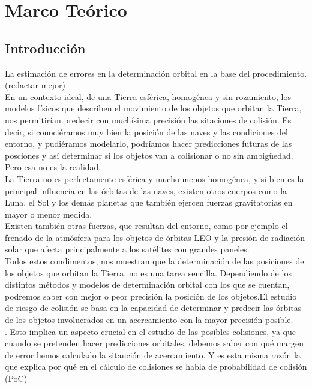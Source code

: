 \chapter{Marco Teórico}
\label{chap:marcoteorico}

\section{Introducci\'on}

La estimaci\'on de errores en la determinaci\'on orbital en la base del procedimiento.(redactar mejor)\\
En un contexto ideal, de una Tierra esf\'erica, homog\'enea y sin rozamiento, los modelos f\'isicos que describen el movimiento de los objetos que orbitan la Tierra, nos permitir\'ian predecir con much\'isima precisi\'on las sitaciones de colisi\'on. Es decir, si conoci\'eramos muy bien la posici\'on de las naves y las condiciones del entorno, y pudi\'eramos modelarlo, podr\'iamos hacer predicciones futuras de las posciones y as\'i determinar si los objetos van a colisionar o no sin ambig\"uedad. Pero esa no es la realidad.\\
La Tierra no es perfectamente esf\'erica y mucho menos homog\'enea, y si bien es la principal influencia en las \'orbitas de las naves, existen otros cuerpos como la Luna, el Sol y los dem\'as planetas que tambi\'en ejercen fuerzas gravitatorias en mayor o menor medida.\\
Existen tambi\'en otras fuerzas, que resultan del entorno, como por ejemplo el frenado de la atm\'osfera para los objetos de \'orbitas LEO y la presi\'on de radiaci\'on solar que afecta principalmente a los sat\'elites con grandes paneles.\\

Todos estos condimentos, nos muestran que la determinaci\'on de las posiciones de los objetos que orbitan la Tierra, no es una tarea sencilla. Dependiendo de los distintos m\'etodos y modelos de determinaci\'on orbital con los que se cuentan, podremos saber con mejor o peor precisi\'on la posici\'on de los objetos.El estudio de riesgo de colisi\'on se basa en la capacidad de determinar y predecir las \'orbitas de los objetos involucrados en un acercamiento con la mayor precisi\'on posible.\\.
Esto implica un aspecto crucial en el estudio de las posibles colisiones, ya que cuando se pretenden hacer predicciones orbitales, debemos saber con qu\'e margen de error hemos calculado la sitauci\'on de acercamiento. Y es esta misma raz\'on la que explica por qu\'e en el c\'alculo de colisiones se habla de probabilidad de colisi\'on (PoC)\\

